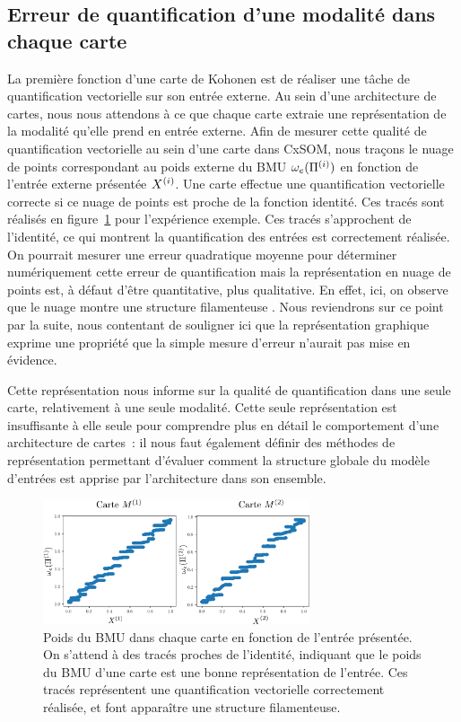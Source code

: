 \documentclass[../main]{subfiles}
\begin{document}
\subsection{Erreur de quantification d'une modalité dans chaque carte}

La première fonction d'une carte de Kohonen est de réaliser une tâche de quantification vectorielle sur son entrée externe. Au sein d'une architecture de cartes, nous nous attendons à ce que chaque carte extraie une représentation de la modalité qu'elle prend en entrée externe.
Afin de mesurer cette qualité de quantification vectorielle au sein d'une carte dans CxSOM, nous traçons le nuage de points correspondant au poids externe du BMU $\omega_e(\Pi^{({i})})$ en fonction de l'entrée externe présentée $X^{({i})}$. Une carte effectue une quantification vectorielle correcte si ce nuage de points est proche de la fonction identité.
Ces tracés sont réalisés en figure~\ref{fig:erreur} pour l'expérience exemple. Ces tracés s'approchent de l'identité, ce qui montrent la quantification des entrées est correctement réalisée.
On pourrait mesurer une erreur quadratique moyenne pour déterminer numériquement cette erreur de quantification mais la représentation en nuage de points est, à défaut d'être quantitative, plus qualitative. 
En effet, ici, on observe que le nuage montre une structure \og filamenteuse \fg{}. Nous reviendrons sur ce point par la suite, nous contentant de souligner ici que la représentation graphique exprime une propriété que la simple mesure d'erreur n'aurait pas mise en évidence.

Cette représentation nous informe sur la qualité de quantification dans une seule carte, relativement à une seule modalité. Cette seule représentation est insuffisante à elle seule pour comprendre plus en détail le comportement d'une architecture de cartes~: il nous faut également définir des méthodes de représentation permettant d'évaluer comment la structure globale du modèle d'entrées est apprise par l'architecture dans son ensemble.

\begin{figure}
    \centering
    \includegraphics[width=0.7\textwidth]{w_x.pdf}
    \caption{Poids du BMU dans chaque carte en fonction de l'entrée présentée. On s'attend à des tracés proches de l'identité, indiquant que le poids du BMU d'une carte est une bonne représentation de l'entrée. 
    Ces tracés représentent une quantification vectorielle correctement réalisée, et font apparaître une structure filamenteuse.
     \label{fig:erreur}}
\end{figure}
\end{document}
